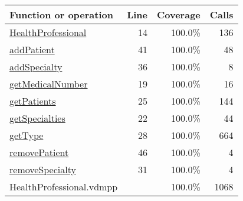 \begin{longtable}{|l|r|r|r|}
\hline
Function or operation & Line & Coverage & Calls \\
\hline
\hline
\hyperref[HealthProfessional:14]{HealthProfessional} & 14&100.0\% & 136 \\
\hline
\hyperref[addPatient:41]{addPatient} & 41&100.0\% & 48 \\
\hline
\hyperref[addSpecialty:36]{addSpecialty} & 36&100.0\% & 8 \\
\hline
\hyperref[getMedicalNumber:19]{getMedicalNumber} & 19&100.0\% & 16 \\
\hline
\hyperref[getPatients:25]{getPatients} & 25&100.0\% & 144 \\
\hline
\hyperref[getSpecialties:22]{getSpecialties} & 22&100.0\% & 44 \\
\hline
\hyperref[getType:28]{getType} & 28&100.0\% & 664 \\
\hline
\hyperref[removePatient:46]{removePatient} & 46&100.0\% & 4 \\
\hline
\hyperref[removeSpecialty:31]{removeSpecialty} & 31&100.0\% & 4 \\
\hline
\hline
HealthProfessional.vdmpp & & 100.0\% & 1068 \\
\hline
\end{longtable}

